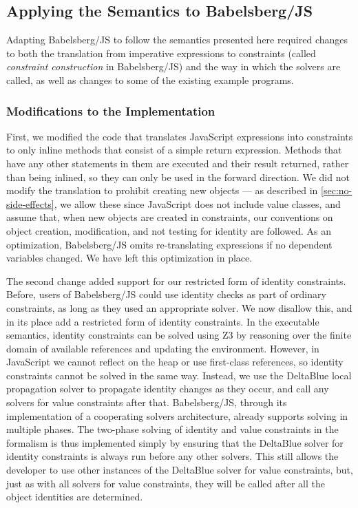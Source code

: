 \documentclass[10pt,reprint]{sigplanconf-preprint}
\newcommand{\javascript}{JavaScript\xspace}
\begin{document}
\subsection{Applying the Semantics to Babelsberg/JS}
\label{sec:apply-semant-babelsb}

Adapting Babelsberg/JS to follow the semantics presented here required
changes to both the translation from imperative expressions to
constraints (called \emph{constraint construction} in Babelsberg/JS)
and the way in which the solvers are called, as well as changes to
some of the existing example programs.

\subsubsection*{Modifications to the Implementation}
\label{sec:modif-impl}
First, we modified the code that translates \javascript expressions
into constraints to only inline methods that consist of a simple
return expression. Methods that have any other statements in them are
executed and their result returned, rather than being inlined,
so they can only be used in the
forward direction. We did not modify the translation to prohibit
creating new objects --- as described in \autoref{sec:no-side-effects}, we
allow these since \javascript does not include value classes, and
assume that, when new objects are created in constraints, our
conventions on object creation, modification, and not testing for
identity are followed. As an optimization, Babelsberg/JS omits
re-translating expressions if no dependent variables changed. We have
left this optimization in place.

The second change added support for our restricted form of identity
constraints. Before, users of Babelsberg/JS could use identity checks
as part of ordinary constraints, as long as they used an appropriate
solver. We now disallow this, and in its place
add a restricted form of identity
constraints. In the executable semantics, identity constraints can be
solved using Z3 by reasoning over the finite domain of available
references and updating the environment. However, in \javascript we
cannot reflect on the heap or use first-class references, so identity
constraints cannot be solved in the same way. Instead, we use the
DeltaBlue local propagation solver \cite{freeman1990incremental} to
propagate identity changes as they occur, and call any solvers for
value constraints after that. Babelsberg/JS, through its
implementation of a cooperating solvers architecture,
already supports solving in multiple phases. The two-phase solving of
identity and value constraints in the formalism is thus implemented
simply by ensuring that the DeltaBlue solver for identity constraints
is always run before any other solvers.  This
still allows the developer to use other instances of the DeltaBlue
solver for value constraints, but, just as with all solvers for value
constraints, they will be called after all the object identities are
determined.
\end{document}
